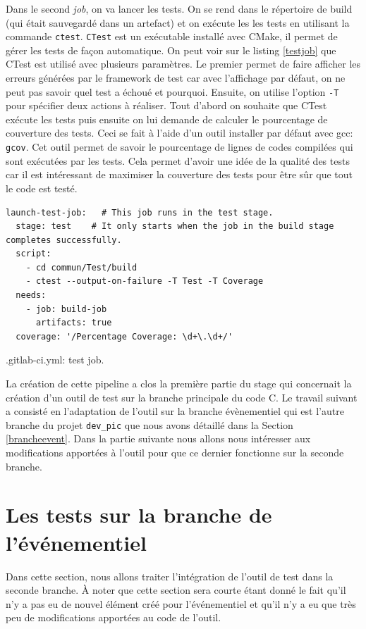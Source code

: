 \documentclass[a4paper]{article}
\begin{document}
Dans le second \textit{job}, on va lancer les tests. On se rend dans le
répertoire de build (qui était sauvegardé dans un artefact) et on exécute les
les tests en utilisant la commande \verb|ctest|. \verb|CTest| est un exécutable
installé avec CMake, il permet de gérer les tests de façon automatique. On peut
voir sur le listing \ref{testjob} que CTest est utilisé avec plusieurs
paramètres. Le premier permet de faire afficher les erreurs générées par le
framework de test car avec l'affichage par défaut, on ne peut pas savoir quel
test a échoué et pourquoi. Ensuite, on utilise l'option \verb|-T| pour spécifier
deux actions à réaliser. Tout d'abord on souhaite que CTest exécute les tests
puis ensuite on lui demande de calculer le pourcentage de couverture des tests.
Ceci se fait à l'aide d'un outil installer par défaut avec gcc: \verb|gcov|. Cet
outil permet de savoir le pourcentage de lignes de codes compilées qui sont
exécutées par les tests. Cela permet d'avoir une idée de la qualité des tests
car il est intéressant de maximiser la couverture des tests pour être sûr que
tout le code est testé.

\begin{listing}[ht!]
\begin{verbatim}
launch-test-job:   # This job runs in the test stage.
  stage: test    # It only starts when the job in the build stage completes successfully.
  script:
    - cd commun/Test/build
    - ctest --output-on-failure -T Test -T Coverage
  needs:
    - job: build-job
      artifacts: true
  coverage: '/Percentage Coverage: \d+\.\d+/'
\end{verbatim}
\caption{.gitlab-ci.yml: test job.}
\label{testjob}
\end{listing}

La création de cette pipeline a clos la première partie du stage qui concernait
la création d'un outil de test sur la branche principale du code C. Le travail
suivant a consisté en l'adaptation de l'outil sur la branche évènementiel qui
est l'autre branche du projet \verb|dev_pic| que nous avons détaillé dans la
Section \ref{brancheevent}. Dans la partie suivante nous allons nous intéresser
aux modifications apportées à l'outil pour que ce dernier fonctionne sur la
seconde branche.
\section{Les tests sur la branche de l'événementiel}%

Dans cette section, nous allons traiter l'intégration de l'outil de test dans la
seconde branche. À noter que cette section sera courte étant donné le fait qu'il
n'y a pas eu de nouvel élément créé pour l'événementiel et qu'il n'y a eu que
très peu de modifications apportées au code de l'outil.
\end{document}
